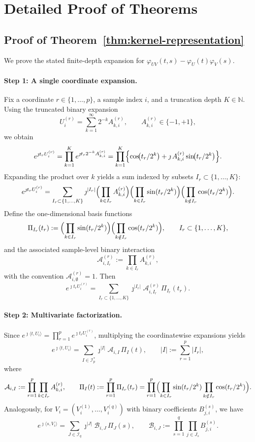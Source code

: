 \documentclass[12pt,reqno,oneside]{amsbook}
\theoremstyle{definition}
\theoremstyle{remark}
\begin{document}
\section{Detailed Proof of Theorems}
\label{theorem_proof}
\subsection{Proof of Theorem~\ref{thm:kernel-representation}}
\label{sec:proof-kernel-representation}

We prove the stated finite-depth expansion for
$\varphi_{UV}(t,s)-\varphi_U(t)\varphi_V(s)$.

\paragraph{Step 1: A single coordinate expansion.}
Fix a coordinate $r\in\{1,\dots,p\}$, a sample index $i$, and a truncation depth
$K\in\mathbb N$.
Using the truncated binary expansion
\[
U_i^{(r)}
= \sum_{k=1}^{\infty} 2^{-k} A^{(r)}_{k,i},
\qquad
A_{k,i}^{(r)}\in\{-1,+1\},
\]
we obtain
\[
e^{\jmath t_r U_i^{(r)}}
=
\prod_{k=1}^K e^{\jmath t_r 2^{-k}A_{k,i}^{(r)}}
=
\prod_{k=1}^K
\Bigl\{
\cos\!\bigl(t_r/2^k\bigr)
+ \jmath\,A_{k,i}^{(r)}\sin\!\bigl(t_r/2^k\bigr)
\Bigr\}.
\]
Expanding the product over $k$ yields a sum indexed by subsets
$I_r\subset\{1,\dots,K\}$:
\[
e^{\jmath t_r U_i^{(r)}}
=
\sum_{I_r\subset\{1,\dots,K\}}
\jmath^{|I_r|}
\Bigl(\prod_{k\in I_r} A_{k,i}^{(r)}\Bigr)
\Bigl(\prod_{k\in I_r}\sin(t_r/2^k)\Bigr)
\Bigl(\prod_{k\notin I_r}\cos(t_r/2^k)\Bigr).
\]
Define the one-dimensional basis functions
\[
\Pi_{I_r}(t_r)
:=
\Bigl(\prod_{k\in I_r}\sin(t_r/2^k)\Bigr)
\Bigl(\prod_{k\notin I_r}\cos(t_r/2^k)\Bigr),
\qquad I_r\subset\{1,\dots,K\},
\]
and the associated sample-level binary interaction
\[
\mathcal A_{i,I_r}^{(r)}
:=
\prod_{k\in I_r}A_{k,i}^{(r)},
\]
with the convention $\mathcal A_{i,\emptyset}^{(r)}=1$. Then
\[
e^{\jmath t_r U_i^{(r)}}
=
\sum_{I_r\subset\{1,\dots,K\}}
\jmath^{|I_r|}
\mathcal A_{i,I_r}^{(r)}\,
\Pi_{I_r}(t_r).
\]

\paragraph{Step 2: Multivariate factorization.}
Since
$e^{\jmath\langle t,U_i\rangle}=\prod_{r=1}^p e^{\jmath t_r U_i^{(r)}}$,
multiplying the coordinatewise expansions yields
\[
e^{\jmath\langle t,U_i\rangle}
=
\sum_{I\in\mathcal I_p^*}
\jmath^{|I|}
\mathcal A_{i,I}\,\Pi_I(t),
\qquad
|I|:=\sum_{r=1}^p |I_r|,
\]
where
\[
\mathcal A_{i,I}
:=
\prod_{r=1}^p \prod_{k\in I_r} A_{k,i}^{(r)},
\qquad
\Pi_I(t)
:=
\prod_{r=1}^p \Pi_{I_r}(t_r)
=
\prod_{r=1}^p
\Bigl(
\prod_{k\in I_r}\sin(t_r/2^k)
\prod_{k\notin I_r}\cos(t_r/2^k)
\Bigr).
\]
Analogously, for $V_i=(V_i^{(1)},\dots,V_i^{(q)})$ with binary coefficients
$B_{j,i}^{(s)}$, we have
\[
e^{\jmath\langle s,V_i\rangle}
=
\sum_{J\in\mathcal I_q}
\jmath^{|J|}
\mathcal B_{i,J}\,\Pi_J(s),
\qquad
\mathcal B_{i,J}
:=
\prod_{s=1}^q \prod_{j\in J_s} B_{j,i}^{(s)}.
\]
\end{document}
